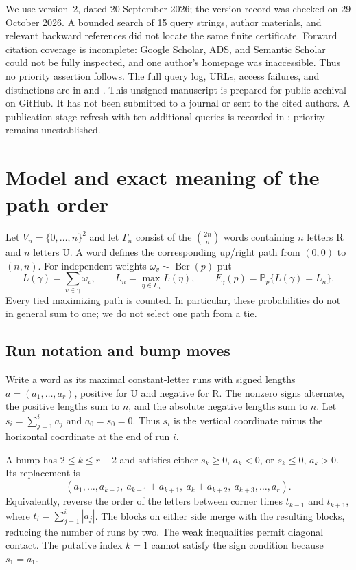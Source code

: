 \documentclass[11pt,a4paper]{article}
\newcommand{\Ber}{\operatorname{Ber}}
\newcommand{\Prob}{\mathbb P}
\newcommand{\R}{\mathrm R}
\newcommand{\U}{\mathrm U}
\begin{document}
We use version~2, dated 20 September 2026; the version record was checked
on 29 October 2026. A bounded search of 15 query strings, author materials,
and relevant backward references did not locate the same finite
certificate. Forward citation coverage is incomplete: Google Scholar,
ADS, and Semantic Scholar could not be fully inspected, and one author's
homepage was inaccessible. Thus no priority assertion follows. The
full query log, URLs, access failures, and distinctions are in
 and .
This unsigned manuscript is prepared for public archival on GitHub.
It has not been submitted to a journal or sent to the cited authors.
A publication-stage refresh with ten additional queries is recorded in
; priority remains unestablished.

\section{Model and exact meaning of the path order}
Let $V_n=\{0,\ldots,n\}^2$ and let $\Gamma_n$ consist of the $\binom{2n}n$
words containing $n$ letters $\R$ and $n$ letters $\U$. A word defines the
corresponding up/right path from $(0,0)$ to $(n,n)$.
For independent weights $\omega_v\sim\Ber(p)$ put
\[
L(\gamma)=\sum_{v\in\gamma}\omega_v,\qquad
L_n=\max_{\eta\in\Gamma_n}L(\eta),\qquad
F_\gamma(p)=\Prob_p\{L(\gamma)=L_n\}.
\]
Every tied maximizing path is counted. In particular, these probabilities
do not in general sum to one; we do not select one path from a tie.

\subsection{Run notation and bump moves}
Write a word as its maximal constant-letter runs with signed lengths
$a=(a_1,\ldots,a_r)$, positive for $\U$ and negative for $\R$.
The nonzero signs alternate, the positive lengths sum to $n$, and the
absolute negative lengths sum to $n$. Let $s_i=\sum_{j=1}^i a_j$ and
$a_0=s_0=0$. Thus $s_i$ is the vertical coordinate minus the horizontal
coordinate at the end of run $i$.

A bump has $2\leq k\leq r-2$ and satisfies either
$s_k\geq0$, $a_k<0$, or $s_k\leq0$, $a_k>0$. Its replacement is
\[
(a_1,\ldots,a_{k-2},\
 a_{k-1}+a_{k+1},\ a_k+a_{k+2},\
 a_{k+3},\ldots,a_r).
\]
Equivalently, reverse the order of the letters between corner times
$t_{k-1}$ and $t_{k+1}$, where
$t_i=\sum_{j=1}^i|a_j|$. The blocks on either side merge with the resulting
blocks, reducing the number of runs by two.
The weak inequalities permit diagonal contact. The putative index
$k=1$ cannot satisfy the sign condition because $s_1=a_1$.
\end{document}
